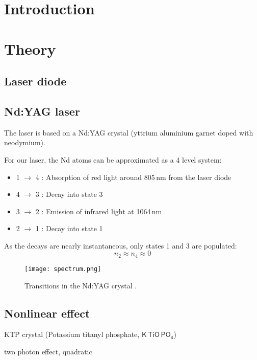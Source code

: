
\section{Introduction}

\section{Theory}

\subsection{Laser diode}


\subsection{Nd:YAG laser}
The laser is based on a Nd:YAG crystal (yttrium aluminium garnet doped with neodymium).

For our laser, the \textsf{Nd} atoms can be approximated as a 4 level system:
\begin{itemize}
\item 1 $\rightarrow$ 4 : Absorption of red light around 805\,nm from the laser diode
\item 4 $\rightarrow$ 3 : Decay into state 3
\item 3 $\rightarrow$ 2 : Emission of infrared light at 1064\,nm
\item 2 $\rightarrow$ 1 : Decay into state 1
\end{itemize}


As the decays are nearly instantaneous, only states 1 and 3 are populated:
\begin{equation}
n_2 \approx n_4 \approx 0
\end{equation}

\begin{figure}[h]
	\centering
	\texttt{[image: spectrum.png]}
	\caption{Transitions in the Nd:YAG crystal \cite{lit:leybold}.}
	\label{fig:spectrum}
\end{figure}


\subsection{Nonlinear effect}
KTP crystal (Potassium titanyl phosphate, $\mathsf{K\,TiO\,PO_4}$)

two photon effect, quadratic

